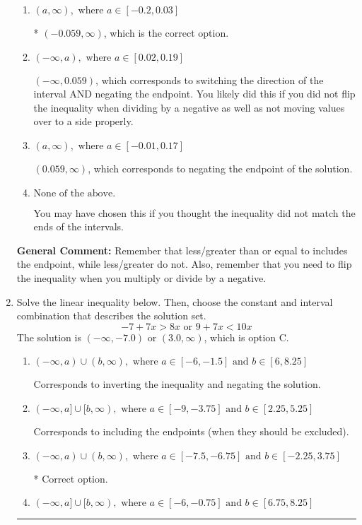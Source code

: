 \documentclass{extbook}[14pt]
\newcommand{\litem}[1]{\item #1

\rule{\textwidth}{0.4pt}}
\begin{document}
\begin{enumerate}
{\begin{enumerate}[label=\Alph*.]
 $(-\infty, -0.059)$, which corresponds to switching the direction of the interval. You likely did this if you did not flip the inequality when dividing by a negative!
\item \( (a, \infty), \text{ where } a \in [-0.2, 0.03] \)

* $(-0.059, \infty)$, which is the correct option.
\item \( (-\infty, a), \text{ where } a \in [0.02, 0.19] \)

 $(-\infty, 0.059)$, which corresponds to switching the direction of the interval AND negating the endpoint. You likely did this if you did not flip the inequality when dividing by a negative as well as not moving values over to a side properly.
\item \( (a, \infty), \text{ where } a \in [-0.01, 0.17] \)

 $(0.059, \infty)$, which corresponds to negating the endpoint of the solution.
\item \( \text{None of the above}. \)

You may have chosen this if you thought the inequality did not match the ends of the intervals.
\end{enumerate}

\textbf{General Comment:} Remember that less/greater than or equal to includes the endpoint, while less/greater do not. Also, remember that you need to flip the inequality when you multiply or divide by a negative.
}
\litem{
Solve the linear inequality below. Then, choose the constant and interval combination that describes the solution set.
\[ -7 + 7 x > 8 x \text{ or } 9 + 7 x < 10 x \]The solution is \( (-\infty, -7.0) \text{ or } (3.0, \infty) \), which is option C.\begin{enumerate}[label=\Alph*.]
\item \( (-\infty, a) \cup (b, \infty), \text{ where } a \in [-6, -1.5] \text{ and } b \in [6, 8.25] \)

Corresponds to inverting the inequality and negating the solution.
\item \( (-\infty, a] \cup [b, \infty), \text{ where } a \in [-9, -3.75] \text{ and } b \in [2.25, 5.25] \)

Corresponds to including the endpoints (when they should be excluded).
\item \( (-\infty, a) \cup (b, \infty), \text{ where } a \in [-7.5, -6.75] \text{ and } b \in [-2.25, 3.75] \)

 * Correct option.
\item \( (-\infty, a] \cup [b, \infty), \text{ where } a \in [-6, -0.75] \text{ and } b \in [6.75, 8.25] \)


\end{enumerate}}
\end{enumerate}
\end{document}
